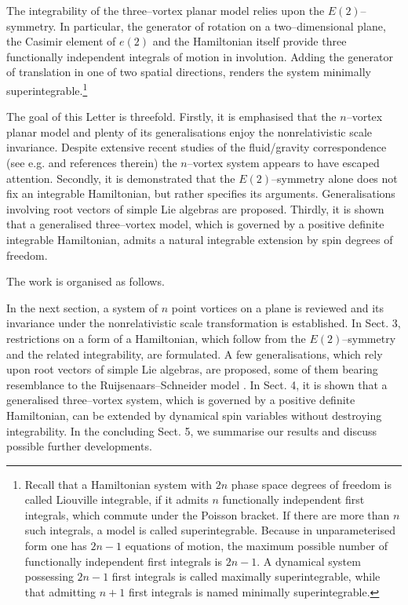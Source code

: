 \documentclass[12pt]{article}
\begin{document}
The integrability of the three--vortex planar model relies upon the $E(2)$--symmetry. In particular, the generator of rotation on a two--dimensional plane, the Casimir element of $e(2)$ and the Hamiltonian itself provide three functionally independent integrals of motion in involution. Adding the generator of translation in one of two spatial directions, renders the system minimally superintegrable.\footnote{Recall that a Hamiltonian system with $2n$ phase space degrees of freedom is called Liouville integrable, if it admits $n$ functionally
independent first integrals, which commute under the Poisson bracket. If there are more than $n$ such integrals, a model is called superintegrable. Because in unparameterised form one has $2n-1$ equations of motion, the maximum possible number of functionally independent first integrals is $2n-1$. A dynamical system possessing $2n-1$ first integrals is called maximally
superintegrable, while that admitting $n+1$ first integrals is named minimally superintegrable.}

The goal of this Letter is threefold. Firstly, it is emphasised that the $n$--vortex planar model and plenty of its generalisations enjoy the nonrelativistic scale invariance. Despite extensive recent studies of the fluid/gravity correspondence (see e.g. \cite{MR} and references therein) the $n$--vortex system appears to have escaped attention. Secondly, it is demonstrated that the $E(2)$--symmetry alone does not fix an integrable Hamiltonian, but rather specifies its arguments. Generalisations involving root vectors of simple Lie algebras are proposed.
Thirdly, it is shown that a generalised three--vortex model, which is governed by a positive definite integrable Hamiltonian, admits a natural integrable extension by spin degrees of freedom.

The work is organised as follows.

In the next section, a system of $n$ point vortices on a plane is reviewed and its invariance under the nonrelativistic scale transformation is established.
In Sect. 3, restrictions on a form of a Hamiltonian, which follow from the $E(2)$--symmetry and the related integrability, are formulated. A few generalisations, which rely upon root vectors of simple Lie algebras, are proposed, some of them bearing resemblance to the Ruijsenaars--Schneider model \cite{RS}. In Sect. 4, it is shown that a generalised
three--vortex system, which is governed by a positive definite  Hamiltonian, can be extended by dynamical spin variables without destroying integrability. In the concluding Sect. 5, we summarise our results and discuss possible further developments.
\end{document}
